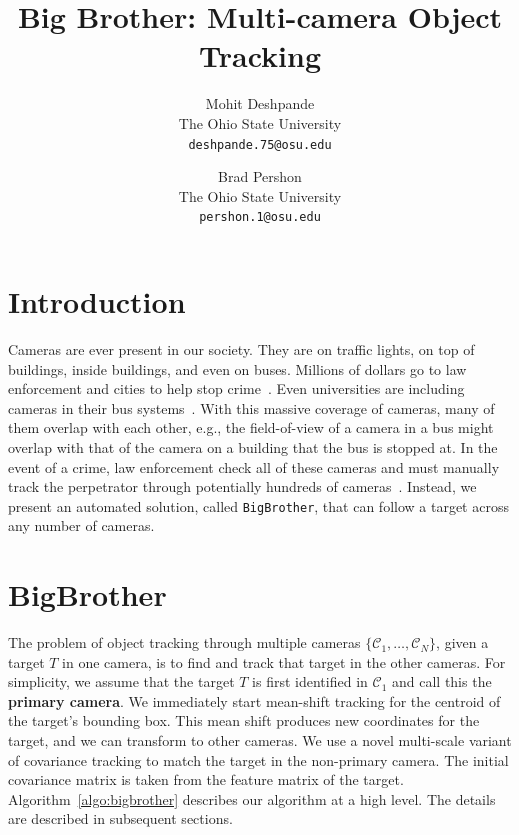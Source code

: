 \documentclass{article}
\begin{document}
\title{Big Brother: Multi-camera Object Tracking}

\author{
  Mohit Deshpande\\
  The Ohio State University\\
  \texttt{deshpande.75@osu.edu}
  \and
  Brad Pershon\\
  The Ohio State University\\
  \texttt{pershon.1@osu.edu}
}

\date{}

\maketitle


\section{Introduction}
Cameras are ever present in our society. They are on traffic lights, on top of buildings, inside buildings, and even on buses. Millions of dollars go to law enforcement and cities to help stop crime~\cite{surveillance}. Even universities are including cameras in their bus systems~\cite{cabs}. With this massive coverage of cameras, many of them overlap with each other, e.g., the field-of-view of a camera in a bus might overlap with that of the camera on a building that the bus is stopped at. In the event of a crime, law enforcement check all of these cameras and must manually track the perpetrator through potentially hundreds of cameras~\cite{surveillance}. Instead, we present an automated solution, called \texttt{BigBrother}, that can follow a target across any number of cameras. 

\section{BigBrother}
\label{sec:bigbrother}
The problem of object tracking through multiple cameras $\{\mathcal{C}_1,\dots,\mathcal{C}_N\}$, given a target $T$ in one camera, is to find and track that target in the other cameras. For simplicity, we assume that the target $T$ is first identified in $\mathcal{C}_1$ and call this the \textbf{primary camera}. We immediately start mean-shift tracking for the centroid of the target's bounding box. This mean shift produces new coordinates for the target, and we can transform to other cameras. We use a novel multi-scale variant of covariance tracking to match the target in the non-primary camera. The initial covariance matrix is taken from the feature matrix of the target. Algorithm~\ref{algo:bigbrother} describes our algorithm at a high level. The details are described in subsequent sections.
\end{document}
